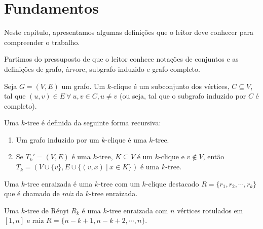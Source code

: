 \chapter{Fundamentos}
\label{cap:fundamentos}

Neste capítulo, apresentamos algumas definições que o leitor deve conhecer para compreender o trabalho.

Partimos do pressuposto de que o leitor conhece notações de conjuntos e as definições de grafo, árvore, subgrafo induzido e grafo completo.

\begin{definition}[$k$-clique]
  \cite{defkclique} Seja $G = (V, E)$ um grafo. Um $k$-clique é um subconjunto dos vértices, $C \subseteq V$, tal que $(u, v) \in E \ \forall \ u, v \in C, u \neq v$ (ou seja, tal que o subgrafo induzido por $C$ é completo).
\end{definition}

\begin{definition}
  \cite{harary} Uma $k$-tree é definida da seguinte forma recursiva:

  \begin{enumerate}
    \item Um grafo induzido por um $k$-clique é uma $k$-tree.
    \item Se $T_k' = (V, E)$ é uma $k$-tree, $K \subseteq V$ é um $k$-clique e $v \not \in V$, então $T_k = (V \cup \{v\}, E \cup \{(v,x) \ | \  x \in K\})$ é uma $k$-tree.
  \end{enumerate}

  Uma $k$-tree enraizada é uma $k$-tree com um $k$-clique destacado $R = \{r_1, r_2, \cdots, r_k\}$ que é chamado de \emph{raiz} da $k$-tree enraizada.
\end{definition}

\begin{definition}
  \cite{renyi} Uma $k$-tree de Rényi $R_k$ é uma $k$-tree enraizada com $n$ vértices rotulados em $[1, n]$ e raiz $R = \{n-k+1, n-k+2, \cdots, n\}$.
\end{definition}

\begin{definition}
  \cite{caminiti} %
\end{definition}

\begin{definition}
  \cite{caminiti} %
\end{definition}

